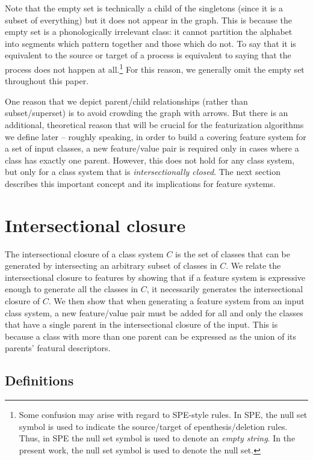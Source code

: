 \documentclass[12pt, oneside]{article}   	%
\begin{document}
Note that the empty set is technically a child of the singletons (since it is a subset of everything) but it does not appear in the graph. This is because the empty set is a phonologically irrelevant class: it cannot partition the alphabet into segments which pattern together and those which do not. To say that it is equivalent to the source or target of a process is equivalent to saying that the process does not happen at all.\footnote{Some confusion may arise with regard to SPE-style rules. In SPE, the null set symbol is used to indicate the source/target of epenthesis/deletion rules. Thus, in SPE the null set symbol is used to denote an \emph{empty string}. In the present work, the null set symbol is used to denote the null set.} For this reason, we generally omit the empty set throughout this paper.

One reason that we depict parent/child relationships (rather than subset/superset) is to avoid crowding the graph with arrows. But there is an additional, theoretical reason that will be crucial for the featurization algorithms we define later -- roughly speaking, in order to build a covering feature system for a set of input classes, a new feature/value pair is required only in cases where a class has exactly one parent. However, this does not hold for any class system, but only for a class system that is \textit{intersectionally closed}. The next section describes this important concept and its implications for feature systems.

\FloatBarrier
\section{Intersectional closure}
\label{sec:intersectional}

The intersectional closure of a class system $C$ is the set of classes that can be generated by intersecting an arbitrary subset of classes in $C$. We relate the intersectional closure to features by showing that if a feature system is expressive enough to generate all the classes in $C$, it necessarily generates the intersectional closure of $C$. We then show that when generating a feature system from an input class system, a new feature/value pair must be added for all and only the classes that have a single parent in the intersectional closure of the input. This is because a class with more than one parent can be expressed as the union of its parents' featural descriptors.

\subsection{Definitions}
\end{document}
